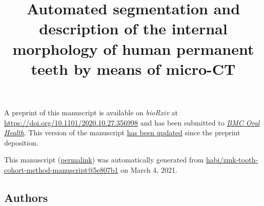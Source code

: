 \documentclass[
  american,
]{article}
\title{Automated segmentation and description of the internal morphology of human permanent teeth by means of micro-CT}
\author{}
\date{}
\begin{document}
\maketitle

A preprint of this manuscript is available on \emph{bioRxiv} at \url{https://doi.org/10.1101/2020.10.27.356998} and has been submitted to \href{https://bmcoralhealth.biomedcentral.com/}{\emph{BMC Oral Health}}.
This version of the manuscript \href{https://github.com/habi/zmk-tooth-cohort-method-manuscript/compare/f9b3333c625228f4f28211a34f381b9f87c430b0...5e807b16ac2e386569de57f32a6678be4e8a29d2}{has been updated} since the preprint deposition.

This manuscript
(\href{https://habi.github.io/zmk-tooth-cohort-method-manuscript/v/5e807b16ac2e386569de57f32a6678be4e8a29d2/}{permalink})
was automatically generated
from \href{https://github.com/habi/zmk-tooth-cohort-method-manuscript/tree/5e807b16ac2e386569de57f32a6678be4e8a29d2}{habi/zmk-tooth-cohort-method-manuscript@5e807b1}
on March 4, 2021.

\hypertarget{authors}{%
\subsection{Authors}\label{authors}}
\end{document}
